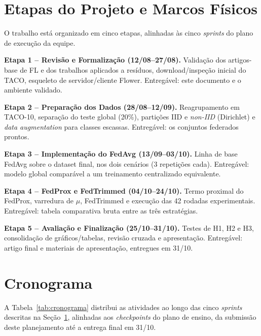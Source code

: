 \documentclass[conference]{IEEEtran}
\begin{document}
\section{Etapas do Projeto e Marcos Físicos}
\label{sec:etapas}

O trabalho está organizado em cinco etapas, alinhadas às cinco \textit{sprints} do plano de execução da equipe.

\textbf{Etapa 1 -- Revisão e Formalização (12/08--27/08).} Validação dos artigos-base de FL e dos trabalhos aplicados a resíduos, download/inspeção inicial do TACO, esqueleto de servidor/cliente Flower. Entregável: este documento e o ambiente validado.

\textbf{Etapa 2 -- Preparação dos Dados (28/08--12/09).} Reagrupamento em TACO-10, separação do teste global (20\%), partições IID e \textit{non-IID} (Dirichlet) e \textit{data augmentation} para classes escassas. Entregável: os conjuntos federados prontos.

\textbf{Etapa 3 -- Implementação do FedAvg (13/09--03/10).} Linha de base FedAvg sobre o dataset final, nos dois cenários (3 repetições cada). Entregável: modelo global comparável a um treinamento centralizado equivalente.

\textbf{Etapa 4 -- FedProx e FedTrimmed (04/10--24/10).} Termo proximal do FedProx, varredura de $\mu$, FedTrimmed e execução das 42 rodadas experimentais. Entregável: tabela comparativa bruta entre as três estratégias.

\textbf{Etapa 5 -- Avaliação e Finalização (25/10--31/10).} Testes de H1, H2 e H3, consolidação de gráficos/tabelas, revisão cruzada e apresentação. Entregável: artigo final e materiais de apresentação, entregues em 31/10.

\section{Cronograma}
\label{sec:cronograma}

A Tabela~\ref{tab:cronograma} distribui as atividades ao longo das cinco \textit{sprints} descritas na Seção~\ref{sec:etapas}, alinhadas aos \textit{checkpoints} do plano de ensino, da submissão deste planejamento até a entrega final em 31/10.
\end{document}
